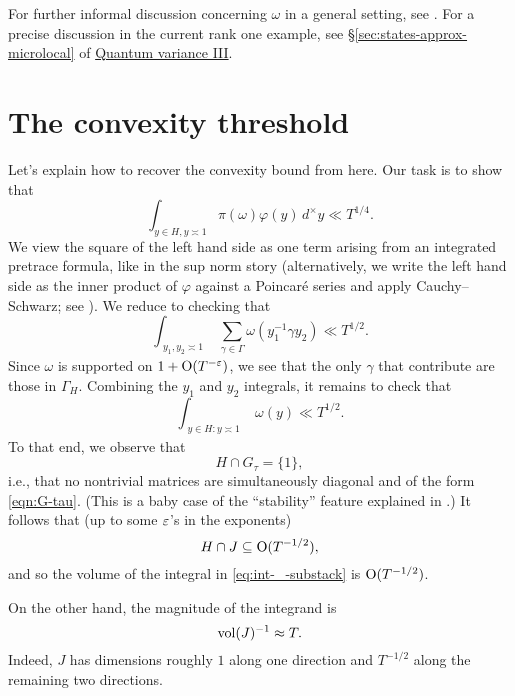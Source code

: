 \documentclass[reqno]{amsart} 
\numberwithin{equation}{section}
\numberwithin{theorem}{section}
\begin{document}
For further informal discussion concerning $\omega$ in a general setting, see \cite[\S2]{2020arXiv201202187N}.  For a precise discussion in the current rank one example, see \S\ref{sec:states-approx-microlocal} of \href{var-quat-3-submitted.pdf}{Quantum variance III}.


\section{The convexity threshold}\label{sec:org82a14f5}
Let's explain how to recover the convexity bound from here.  Our task is to show that
\begin{equation*}
  \int _{y \in H, y \asymp 1} \pi(\omega) \varphi(y) \, d^\times y \ll T^{1/4}.
\end{equation*}
We view the square of the left hand side as one term arising from an integrated pretrace formula, like in the sup norm story \cite{iwan-sar} (alternatively, we write the left hand side as the inner product of $\varphi$ against a Poincar{\'e} series and apply Cauchy--Schwarz; see \cite[\S5.3]{2020arXiv201202187N}).  We reduce to checking that
\begin{equation}\label{eq:int-_-substack-1}
  \int _{
    \substack{
      y_1, y_2 \asymp 1
    }
  }
  \sum _{\gamma \in \Gamma }
  \omega (y_1^{-1} \gamma y_2)
  \ll
  T^{1/2}.
\end{equation}
Since $\omega$ is supported on $1 + \operatorname{O}(T^{-\varepsilon})$, we see that the only $\gamma$ that contribute are those in $\Gamma_{H}$.  Combining the $y_1$ and $y_2$ integrals, it remains to check that
\begin{equation}\label{eq:int-_-substack}
  \int _{
    \substack{
      y \in H : y\asymp 1
    }
  }
  \omega (y)
  \ll
  T^{1/2}.
\end{equation}
To that end, we observe that
\begin{equation*}
  H \cap G_\tau = \{1\},
\end{equation*}
i.e., that no nontrivial matrices are simultaneously diagonal and of the form \eqref{eqn:G-tau}.  (This is a baby case of the ``stability'' feature explained in \cite[\S1.9, \S14]{nelson-venkatesh-1}.)  It follows that (up to some $\varepsilon$'s in the exponents)
\begin{equation*}
  H \cap J \subseteq \operatorname{O}(T^{-1/2}),
\end{equation*}
and so the volume of the integral in  \eqref{eq:int-_-substack} is $\operatorname{O}(T^{-1/2})$.

On the other hand, the magnitude of the integrand is
\begin{equation*}
  \operatorname{vol}(J)^{-1} \approx T.
\end{equation*}
Indeed, $J$ has dimensions roughly $1$ along one direction and $T^{-1/2}$ along the remaining two directions.
\end{document}
